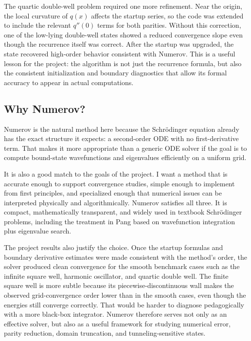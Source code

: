 \documentclass[11pt]{article}
\begin{document}
    The quartic double-well problem required one more refinement. Near the origin, the local curvature of $q(x)$ affects the startup series, so the code was extended to include the relevant $q''(0)$ terms for both parities. Without this correction, one of the low-lying double-well states showed a reduced convergence slope even though the recurrence itself was correct. After the startup was upgraded, the state recovered high-order behavior consistent with Numerov. This is a useful lesson for the project: the algorithm is not just the recurrence formula, but also the consistent initialization and boundary diagnostics that allow its formal accuracy to appear in actual computations.

    \subsection{Why Numerov?}

    Numerov is the natural method here because the Schr\"odinger equation already has the exact structure it expects: a second-order ODE with no first-derivative term. That makes it more appropriate than a generic ODE solver if the goal is to compute bound-state wavefunctions and eigenvalues efficiently on a uniform grid.

    It is also a good match to the goals of the project. I want a method that is accurate enough to support convergence studies, simple enough to implement from first principles, and specialized enough that numerical issues can be interpreted physically and algorithmically. Numerov satisfies all three. It is compact, mathematically transparent, and widely used in textbook Schr\"odinger problems, including the treatment in Pang based on wavefunction integration plus eigenvalue search.

    The project results also justify the choice. Once the startup formulas and boundary derivative estimates were made consistent with the method's order, the solver produced clean convergence for the smooth benchmark cases such as the infinite square well, harmonic oscillator, and quartic double well. The finite square well is more subtle because its piecewise-discontinuous wall makes the observed grid-convergence order lower than in the smooth cases, even though the energies still converge correctly. That would be harder to diagnose pedagogically with a more black-box integrator. Numerov therefore serves not only as an effective solver, but also as a useful framework for studying numerical error, parity reduction, domain truncation, and tunneling-sensitive states.
\end{document}
